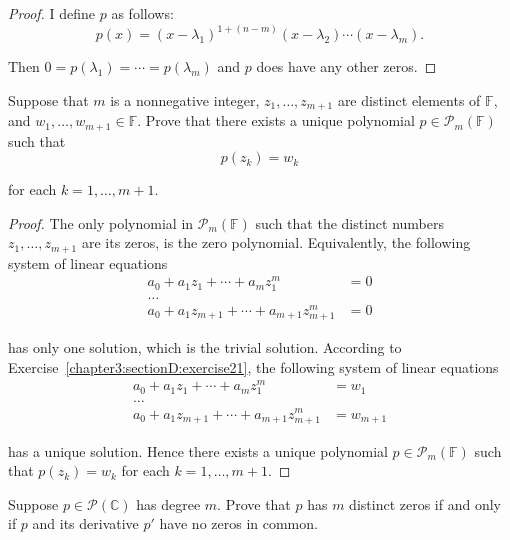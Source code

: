 \begin{proof}
    I define $p$ as follows:
    \[
        p(x) = {(x - \lambda_{1})}^{1+(n-m)}(x-\lambda_{2})\cdots (x - \lambda_{m}).
    \]

    Then $0 = p(\lambda_{1}) = \cdots = p(\lambda_{m})$ and $p$ does have any other zeros.
\end{proof}
\newpage

\begin{exercise}\label{chapter4:sectionA:exercise7}
    Suppose that $m$ is a nonnegative integer, $z_{1} , \ldots, z_{m+1}$ are distinct elements of $\mathbb{F}$, and $w_{1} , \ldots, w_{m+1} \in \mathbb{F}$. Prove that there exists a unique polynomial $p\in\mathscr{P}_{m}(\mathbb{F})$ such that
    \[
        p(z_{k}) = w_{k}
    \]

    for each $k = 1,\ldots, m+1$.
\end{exercise}

\begin{proof}
    The only polynomial in $\mathscr{P}_{m}(\mathbb{F})$ such that the distinct numbers $z_{1} , \ldots, z_{m+1}$ are its zeros, is the zero polynomial. Equivalently, the following system of linear equations
    \begin{align*}
        a_{0} + a_{1}z_{1} + \cdots + a_{m}z_{1}^{m}       & = 0 \\
        \ldots                                                   \\
        a_{0} + a_{1}z_{m+1} + \cdots + a_{m+1}z_{m+1}^{m} & = 0
    \end{align*}

    has only one solution, which is the trivial solution. According to Exercise~\ref{chapter3:sectionD:exercise21}, the following system of linear equations
    \begin{align*}
        a_{0} + a_{1}z_{1} + \cdots + a_{m}z_{1}^{m}       & = w_{1}   \\
        \ldots                                                         \\
        a_{0} + a_{1}z_{m+1} + \cdots + a_{m+1}z_{m+1}^{m} & = w_{m+1}
    \end{align*}

    has a unique solution. Hence there exists a unique polynomial $p\in\mathscr{P}_{m}(\mathbb{F})$ such that $p(z_{k}) = w_{k}$ for each $k = 1,\ldots, m+1$.
\end{proof}
\newpage

\begin{exercise}\label{chapter4:sectionA:exercise8}
    Suppose $p\in \mathscr{P}(\mathbb{C})$ has degree $m$. Prove that $p$ has $m$ distinct zeros if and only if $p$ and its derivative $p'$ have no zeros in common.
\end{exercise}

